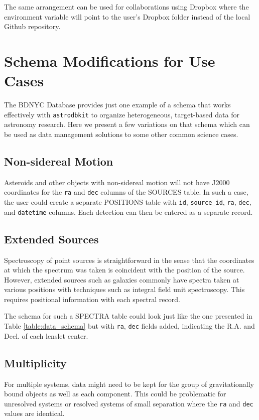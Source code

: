 \documentclass[iop,revtex4,natbib209]{emulateapj}
\begin{document}
The same arrangement can be used for collaborations using Dropbox where the environment variable will point to the user's Dropbox folder instead of the local Github repository.

\section{Schema Modifications for Use Cases}{\label{sec:use_cases}}
The BDNYC Database provides just one example of a schema that works effectively with \texttt{astrodbkit} to organize heterogeneous, target-based data for astronomy research. Here we present a few variations on that schema which can be used as data management solutions to some other common science cases.

\subsection{Non-sidereal Motion}
Asteroids and other objects with non-sidereal motion will not have J2000 coordinates for the \texttt{ra} and \texttt{dec} columns of the SOURCES table. In such a case, the user could create a separate POSITIONS table with \texttt{id}, \texttt{source\_id}, \texttt{ra}, \texttt{dec}, and \texttt{datetime} columns. Each detection can then be entered as a separate record. 

\subsection{Extended Sources}
Spectroscopy of point sources is straightforward in the sense that the coordinates at which the spectrum was taken is coincident with the position of the source. However, extended sources such as galaxies commonly have spectra taken at various positions with techniques such as integral field unit spectroscopy. This requires positional information with each spectral record.

The schema for such a SPECTRA table could look just like the one presented in Table \ref{table:data_schema} but with \texttt{ra}, \texttt{dec} fields added, indicating the R.A. and Decl. of each lenslet center.

\subsection{Multiplicity}
For multiple systems, data might need to be kept for the group of gravitationally bound objects as well as each component. This could be problematic for unresolved systems or resolved systems of small separation where the \texttt{ra} and \texttt{dec} values are identical. 
\end{document}
